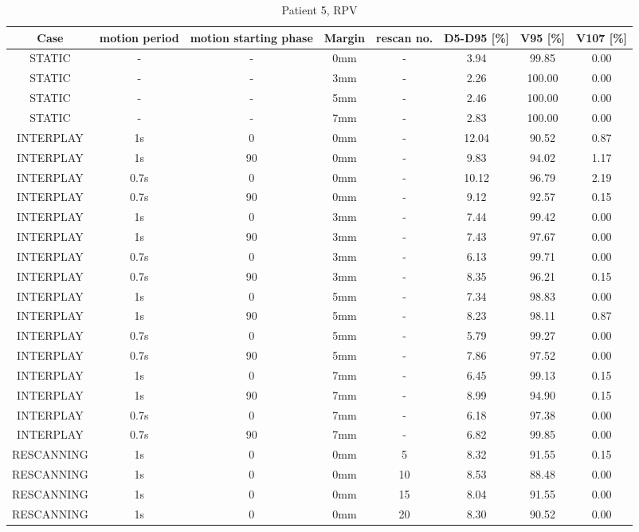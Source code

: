\begin{table}[H]
  \centering
  \tiny
  \caption{Patient 5, RPV}
  \begin{tabular}{|c||c|c|c|c||c|c|c|}
    \hline\hline
    Case & motion period & motion starting phase & Margin & rescan no. & D5-D95 [\%] & V95 [\%] & V107 [\%] \\
    \hline 
STATIC & - & - & 0mm & - & 3.94 & 99.85 & 0.00 \\
STATIC & - & - & 3mm & - & 2.26 & 100.00 & 0.00 \\
STATIC & - & - & 5mm & - & 2.46 & 100.00 & 0.00 \\
STATIC & - & - & 7mm & - & 2.83 & 100.00 & 0.00 \\
INTERPLAY & 1s & 0 & 0mm & - & 12.04 & 90.52 & 0.87 \\
INTERPLAY & 1s & 90 & 0mm & - & 9.83 & 94.02 & 1.17 \\
INTERPLAY & 0.7s & 0 & 0mm & - & 10.12 & 96.79 & 2.19 \\
INTERPLAY & 0.7s & 90 & 0mm & - & 9.12 & 92.57 & 0.15 \\
INTERPLAY & 1s & 0 & 3mm & - & 7.44 & 99.42 & 0.00 \\
INTERPLAY & 1s & 90 & 3mm & - & 7.43 & 97.67 & 0.00 \\
INTERPLAY & 0.7s & 0 & 3mm & - & 6.13 & 99.71 & 0.00 \\
INTERPLAY & 0.7s & 90 & 3mm & - & 8.35 & 96.21 & 0.15 \\
INTERPLAY & 1s & 0 & 5mm & - & 7.34 & 98.83 & 0.00 \\
INTERPLAY & 1s & 90 & 5mm & - & 8.23 & 98.11 & 0.87 \\
INTERPLAY & 0.7s & 0 & 5mm & - & 5.79 & 99.27 & 0.00 \\
INTERPLAY & 0.7s & 90 & 5mm & - & 7.86 & 97.52 & 0.00 \\
INTERPLAY & 1s & 0 & 7mm & - & 6.45 & 99.13 & 0.15 \\
INTERPLAY & 1s & 90 & 7mm & - & 8.99 & 94.90 & 0.15 \\
INTERPLAY & 0.7s & 0 & 7mm & - & 6.18 & 97.38 & 0.00 \\
INTERPLAY & 0.7s & 90 & 7mm & - & 6.82 & 99.85 & 0.00 \\
RESCANNING & 1s & 0 & 0mm & 5 & 8.32 & 91.55 & 0.15 \\
RESCANNING & 1s & 0 & 0mm & 10 & 8.53 & 88.48 & 0.00 \\
RESCANNING & 1s & 0 & 0mm & 15 & 8.04 & 91.55 & 0.00 \\
RESCANNING & 1s & 0 & 0mm & 20 & 8.30 & 90.52 & 0.00 \\

\end{tabular}
\end{table}
